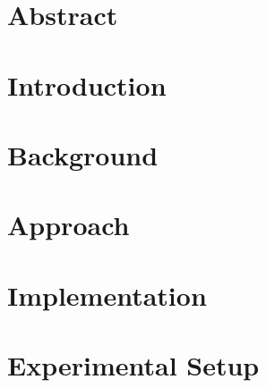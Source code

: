 \documentclass[11pt,a4paper]{book}
\begin{document}
\frontmatter


\chapter*{Abstract}



\tableofcontents

\mainmatter
\chapter{Introduction}
\label{s:Introduction}


\chapter{Background}
\label{s:Background}


\chapter{Approach}
\label{s:Approach}


\chapter{Implementation}
\label{s:Implementation}


\chapter{Experimental Setup}
\label{s:Experimental Setup}

\end{document}
